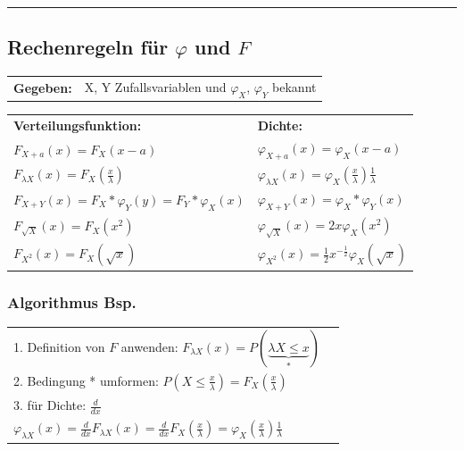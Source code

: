 \hrule

	\subsection{Rechenregeln für $\varphi$ und $F$ }
		\begin{minipage}{11cm}
			\begin{tabular}{ll}
        	\textbf{Gegeben:} &X, Y Zufallsvariablen und $\varphi_X$, $\varphi_Y$
        	bekannt\\
        	\end{tabular}
 
        	\begin{tabular}{p{6cm}p{6cm}}
        	\textbf{Verteilungsfunktion:} & \textbf{Dichte:}\\
        	$F_{X+a}(x)=F_X(x-a)$  &$\varphi_{X+a}(x)=\varphi_X(x-a)$\\
        	$F_{\lambda X}(x)=F_X(\frac{x}{\lambda})$ &$\varphi_{\lambda
        	X}(x)=\varphi_X(\frac{x}{\lambda})\frac{1}{\lambda}$\\
        	$F_{X+Y}(x)=F_X\ast\varphi_Y(y)=F_Y\ast\varphi_X(x)$ &
        	$\varphi_{X+Y}(x)=\varphi_X\ast\varphi_Y(x)$\\
        	$F_{\sqrt{X}}(x)=F_X(x^2)$ &
        	$\varphi_{\sqrt{X}}(x)=2x\varphi_X(x^2)$\\
        	$F_{X^2}(x)=F_X(\sqrt{x})$ &
        	$\varphi_{X^2}(x)=\frac{1}{2}x^{-\frac{1}{2}}\varphi_X(\sqrt{x})$
        	\end{tabular}
		\end{minipage}
		\begin{minipage}{7cm}
        	\subsubsection{Algorithmus Bsp.}
        	\begin{tabular}{ll}
        	1. Definition von $F$ anwenden: $F_{\lambda X}(x)=P(\underbrace
        	{\lambda X\leq x}_{*})$\\ 
        	2. Bedingung * umformen: $P(X \leq
        	\frac{x}{\lambda})=F_X(\frac{x}{\lambda})$\\ 
        	3. für Dichte: $\frac{d}{dx}$\\
        	\vspace{3mm}
        	$\varphi_{\lambda X}(x)=\frac{d}{dx}F_{\lambda
        	X}(x)=\frac{d}{dx}F_X(\frac{x}{\lambda})=
        	\varphi_X(\frac{x}{\lambda})\frac{1}{\lambda}$
        	\end{tabular}
			\vspace{10mm}
        \end{minipage}
